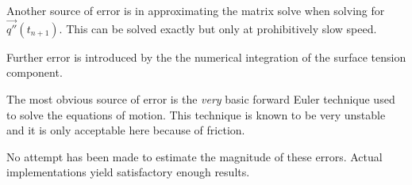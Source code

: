 \documentclass{article}
\begin{document}
Another source of error is in approximating the matrix solve when solving for
$\vec{q''}(t_{n+1})$. This can be solved exactly but only at prohibitively slow
speed.

Further error is introduced by the the numerical integration of the surface
tension component.

The most obvious source of error is the \emph{very} basic forward Euler
technique used to solve the equations of motion. This technique is known to be
very unstable and it is only acceptable here because of friction.

No attempt has been made to estimate the magnitude of these errors. Actual
implementations yield satisfactory enough results.
\end{document}
